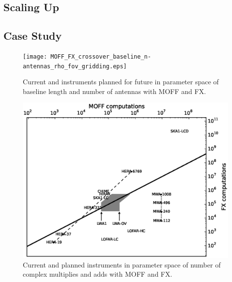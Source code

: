 \documentclass[a4paper,fleqn,usenatbib]{../mnras}
\begin{document}
\subsection{Scaling Up}
\subsection{Case Study}


\begin{figure}
  \texttt{[image: MOFF\_FX\_crossover\_baseline\_n-antennas\_rho\_fov\_gridding.eps]}
  \caption{Current and instruments planned for future in parameter space of
    baseline length and number of antennas with MOFF and FX.}
  \label{fig:parameter-space-bll-nant-instruments}
\end{figure}

\begin{figure}
  \includegraphics[width=\columnwidth]{MOFF_FX_computations_fov_gridding_annotated.eps}
  \caption{Current and planned instruments in parameter space of
    number of complex multiplies and adds with MOFF and FX.}
  \label{fig:parameter-space-computations-instruments}
\end{figure}



\end{document}

